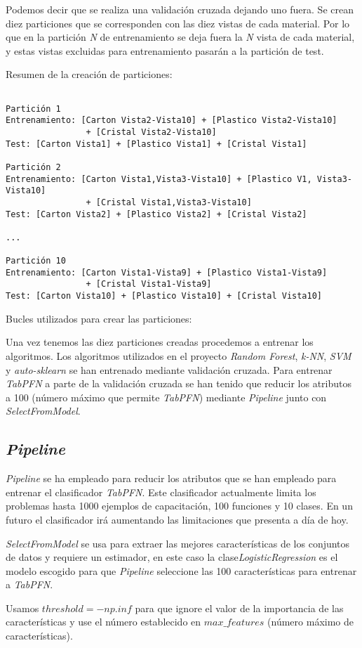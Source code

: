 Podemos decir que se realiza una validación cruzada dejando uno fuera. Se crean diez particiones que se corresponden con las diez vistas de cada material. Por lo que en la partición \textit{N} de entrenamiento se deja fuera la \textit{N} vista de cada material, y estas vistas excluidas para entrenamiento pasarán a la partición de test.

Resumen de la creación de particiones:
\begin{verbatim}

Partición 1
Entrenamiento: [Carton Vista2-Vista10] + [Plastico Vista2-Vista10] 
				+ [Cristal Vista2-Vista10]
Test: [Carton Vista1] + [Plastico Vista1] + [Cristal Vista1]

Partición 2
Entrenamiento: [Carton Vista1,Vista3-Vista10] + [Plastico V1, Vista3-Vista10] 
				+ [Cristal Vista1,Vista3-Vista10]
Test: [Carton Vista2] + [Plastico Vista2] + [Cristal Vista2]

...

Partición 10
Entrenamiento: [Carton Vista1-Vista9] + [Plastico Vista1-Vista9] 
				+ [Cristal Vista1-Vista9]
Test: [Carton Vista10] + [Plastico Vista10] + [Cristal Vista10]

\end{verbatim}

Bucles utilizados para crear las particiones:



Una vez tenemos las diez particiones creadas procedemos a entrenar los algoritmos.
Los algoritmos utilizados en el proyecto \textit{Random Forest}, \textit{k-NN}, \textit{SVM} y \textit{auto-sklearn} se han entrenado mediante validación cruzada. Para entrenar \textit{TabPFN} a parte de la validación cruzada se han tenido que reducir los atributos a 100 (número máximo que permite \textit{TabPFN})  mediante \textit{Pipeline} junto con \textit{SelectFromModel}.


\subsection{\textit{Pipeline}}

\textit{Pipeline} se ha empleado para reducir los atributos que se han empleado para entrenar el clasificador \textit{TabPFN}. Este clasificador actualmente limita los problemas hasta 1000 ejemplos de capacitación, 100 funciones y 10 clases. En un futuro el clasificador irá aumentando las limitaciones que presenta a día de hoy. 

\textit{SelectFromModel} se usa para extraer las mejores características de los conjuntos de datos y requiere un estimador, en este caso la clase\textit{LogisticRegression} es el modelo escogido para que \textit{Pipeline} seleccione las 100 características para entrenar a \textit{TabPFN}.


Usamos $threshold=-np.inf$ para que ignore el valor de la importancia de las características y use el número establecido en $max\_features$ (número máximo de características).